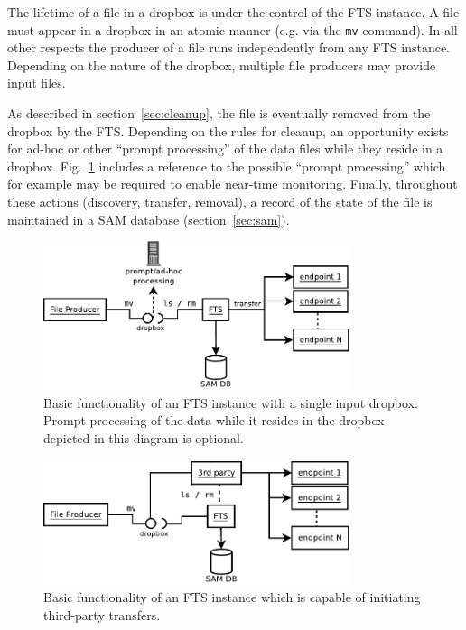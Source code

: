 \documentclass[pdftex,12pt,letter]{article}
\begin{document}
The lifetime of a file in a dropbox is under the control of the FTS
instance.  A file must appear in a dropbox in an atomic manner
(e.g. via the \texttt{mv} command). In all other respects the producer
of a file runs independently from any FTS instance.  Depending on the
nature of the dropbox, multiple file producers may provide input files.



As described in
section~\ref{sec:cleanup}, the file is eventually removed from the
dropbox by the FTS.  Depending on the rules for cleanup, an opportunity
exists for ad-hoc or other ``prompt processing'' of the data files while
they reside in a dropbox. Fig.~\ref{fig:ftsbasics} includes a reference to the possible
``prompt processing'' which for example may be required to enable
near-time monitoring. Finally, throughout these actions (discovery, transfer,
removal), a record of the state of the file is maintained in a SAM
database (section~\ref{sec:sam}).

\begin{figure}[tbh]
  \centering
  \includegraphics[width=0.8\textwidth]{fts-basics.pdf}
  \caption{Basic functionality of an FTS instance with a single input dropbox.
Prompt processing of the data while it resides in the dropbox depicted in this diagram is optional.}
  \label{fig:ftsbasics}
\end{figure}

\begin{figure}[tbh]
  \centering
  \includegraphics[width=0.8\textwidth]{fts-basics-3rd.pdf}
  \caption{Basic functionality of an FTS instance which is capable of initiating third-party transfers.}
  \label{fig:ftsbasicsthird}
\end{figure}
\end{document}
